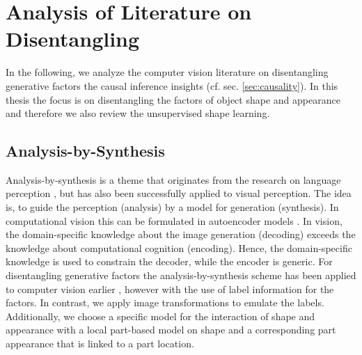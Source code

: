 \chapter{Analysis of Literature on Disentangling}\label{sec:literature}
	In the following, we analyze the computer vision literature on disentangling generative factors \wrt the causal inference insights (cf. sec. \ref{sec:causality}).
	In this thesis the focus is on disentangling the factors of object shape and appearance and therefore we also review the unsupervised shape learning.


\section{Analysis-by-Synthesis}
	Analysis-by-synthesis is a theme that originates from the research on language perception \eg \cite{bever10anabysyn}, but has also been successfully applied to visual perception.
	The idea is, to guide the perception (analysis) by a model for generation (synthesis).
	In computational vision this can be formulated in autoencoder models \cite{tieleman14thesis}.
	In vision, the domain-specific knowledge about the image generation (decoding) exceeds the knowledge about computational cognition (encoding).
	Hence, the domain-specific knowledge is used to constrain the decoder, while the encoder is generic.
	For disentangling generative factors the analysis-by-synthesis scheme has been applied to computer vision earlier \cite{kulkarni15dcign, yildirim15anabysyn, desjardins12genentangle}, however with the use of label information for the factors.
	In contrast, we apply image transformations to emulate the labels.
	Additionally, we choose a specific model for the interaction of shape and appearance with a local part-based model on shape and a corresponding part appearance that is linked to a part location.



